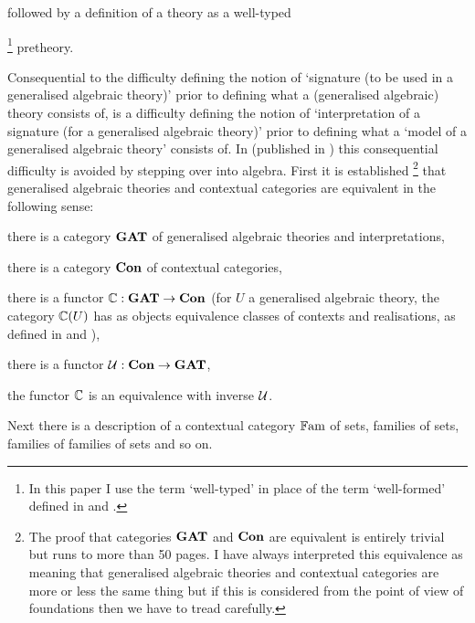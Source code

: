 followed by a definition of a theory as a well-typed{\footnote{In this paper I use the term `well-typed' in place of the term `well-formed' defined in \cite{Cartmell78} and \cite{Cartmell86}.} pretheory. 

\note Consequential to the difficulty defining the notion of `signature 
(to be used in a generalised algebraic theory)' prior to defining
what a (generalised algebraic) theory consists of, is  a difficulty defining the notion of `interpretation of a signature (for a generalised algebraic theory)' prior to 
defining what a `model of a generalised algebraic theory' consists of.  In \cite{Cartmell78} (published in \cite{Cartmell86}) this consequential difficulty is avoided by stepping over into algebra.
First  it is established \footnote{
The proof that categories $\catGAT$ and $\catCon$ are equivalent  is entirely trivial but runs to more than 50 pages. I have always interpreted this equivalence as meaning that generalised algebraic theories and contextual categories are more or less the same thing but if this is considered from the point of view of foundations then we have to tread carefully.} 
that  generalised algebraic theories and contextual categories are equivalent in the following sense: 
\noindent \label{ccgatequivalence}
\begin{point}
there is a category $\catGAT$ of generalised algebraic theories and interpretations,
\end{point}
\begin{point}
there is a category $\catCon$ of contextual categories,
\end{point}
\begin{point}
there is a functor $\ccat[C]: \catGAT \morph \catCon$  (for $U$ a generalised algebraic theory, the category $\ccat[C](U)$ 
has as objects equivalence classes of contexts and realisations, as defined 
in \cite{Cartmell78} and  \cite{Cartmell86}), 
\end{point}
\begin{point}
there is a functor $\gat[U]:\catCon \morph \catGAT$,
\end{point}
\begin{point}
the functor $\ccat[C]$ is an equivalence with inverse $\gat[U]$.
\end{point}
Next there is a description of
a contextual category $\Fam$ of sets, families of sets, families of families of sets and so on. 

}
